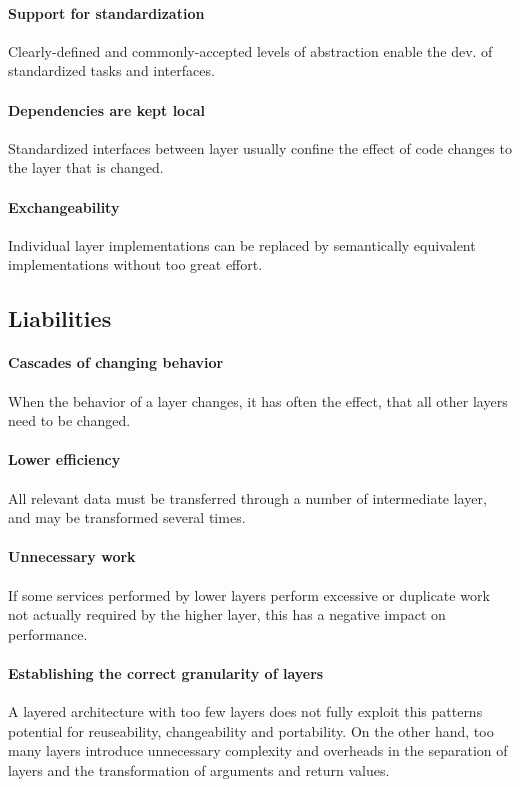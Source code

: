 \documentclass[a4paper,11pt,twocolumn]{report}
\begin{document}
    \paragraph{Support for standardization}
    Clearly-defined and commonly-accepted levels of abstraction enable the dev.
    of standardized tasks and interfaces.
    \paragraph{Dependencies are kept local}
    Standardized interfaces between layer usually confine the effect of code
    changes to the layer that is changed.
    \paragraph{Exchangeability}
    Individual layer implementations can be replaced by semantically equivalent
    implementations without too great effort.
    \subsection{Liabilities}
    \paragraph{Cascades of changing behavior}
    When the behavior of a layer changes, it has often the effect, that all
    other layers need to be changed.
    \paragraph{Lower efficiency}
    All relevant data must be transferred through a number of intermediate
    layer, and may be transformed several times.
    \paragraph{Unnecessary work}
    If some services performed by lower layers perform excessive or duplicate
    work not actually required by the higher layer, this has a negative impact
    on performance.
    \paragraph{Establishing the correct granularity of layers}
    A layered architecture with too few layers does not fully exploit this
    patterns potential for reuseability, changeability and portability. On the
    other hand, too many layers introduce unnecessary complexity and overheads
    in the separation of layers and the transformation of arguments and return
    values.
\end{document}
